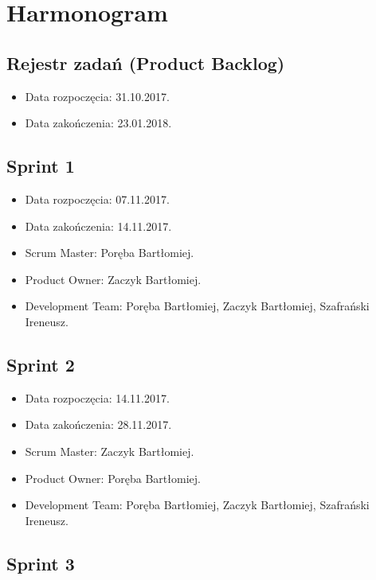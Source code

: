 \documentclass[a4paper]{article}
\begin{document}
\section{Harmonogram}

\subsection{Rejestr zadań (Product Backlog)}

\begin{itemize}
\item Data rozpoczęcia: 31.10.2017.
\item  Data zakończenia: 23.01.2018.
\end{itemize}

\subsection{Sprint 1}

\begin{itemize}
\item Data rozpoczęcia: 07.11.2017.
\item Data zakończenia: 14.11.2017.
\item Scrum Master: Poręba Bartłomiej.
\item Product Owner: Zaczyk Bartłomiej.
\item Development Team: Poręba Bartłomiej, Zaczyk Bartłomiej, Szafrański Ireneusz.
\end{itemize}

\subsection{Sprint 2}

\begin{itemize}
\item Data rozpoczęcia: 14.11.2017.
\item  Data zakończenia: 28.11.2017.
\item Scrum Master: Zaczyk Bartłomiej.
\item Product Owner: Poręba Bartłomiej.
\item Development Team: Poręba Bartłomiej, Zaczyk Bartłomiej, Szafrański Ireneusz.
\end{itemize}

\subsection{Sprint 3}
\end{document}
